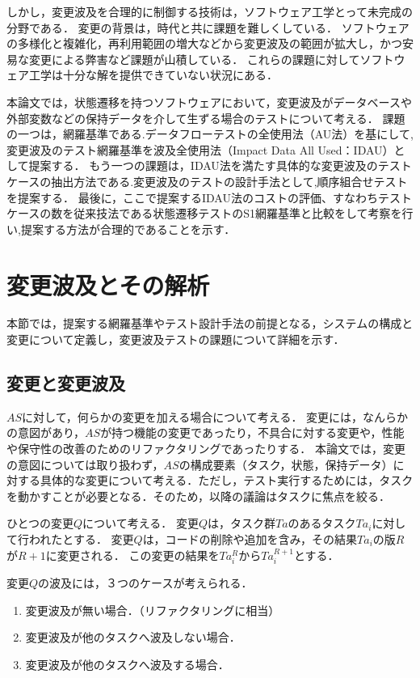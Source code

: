 \documentclass[a4paper,12pt]{jreport}
\begin{document}
しかし，変更波及を合理的に制御する技術は，ソフトウェア工学とって未完成の分野である\cite{arnold1996software}．
変更の背景は，時代と共に課題を難しくしている．
ソフトウェアの多様化と複雑化，再利用範囲の増大などから変更波及の範囲が拡大し，かつ安易な変更による弊害など課題が山積している．
これらの課題に対してソフトウェア工学は十分な解を提供できていない状況にある\cite{li2013survey}．


本論文では，状態遷移を持つソフトウェアにおいて，変更波及がデータベースや外部変数などの保持データを介して生ずる場合のテストについて考える．
課題の一つは，網羅基準である.データフローテストの全使用法（AU法）\cite{beiz90}を基にして,変更波及のテスト網羅基準を波及全使用法（Impact Data All Used：IDAU）として提案する．
もう一つの課題は，IDAU法を満たす具体的な変更波及のテストケースの抽出方法である.変更波及のテストの設計手法として,順序組合せテストを提案する．
最後に，ここで提案するIDAU法のコストの評価、すなわちテストケースの数を従来技法である状態遷移テストのS1網羅基準と比較をして考察を行い,提案する方法が合理的であることを示す．




\section{変更波及とその解析}
本節では，提案する網羅基準やテスト設計手法の前提となる，システムの構成と変更について定義し，変更波及テストの課題について詳細を示す．




\subsection{変更と変更波及}
$AS$に対して，何らかの変更を加える場合について考える．
変更には，なんらかの意図があり，$AS$が持つ機能の変更であったり，不具合に対する変更や，性能や保守性の改善のためのリファクタリングであったりする．
本論文では，変更の意図については取り扱わず，$AS$の構成要素（タスク，状態，保持データ）に対する具体的な変更について考える．ただし，テスト実行するためには，タスクを動かすことが必要となる．そのため，以降の議論はタスクに焦点を絞る．%

ひとつの変更$Q$について考える．
変更$Q$は，タスク群$Ta$のあるタスク$Ta_i$に対して行われたとする．
変更$Q$は，コードの削除や追加を含み，その結果$Ta_i$の版$R$が$R+1$に変更される．
この変更の結果を$Ta^{R}_i$から$Ta^{R+1}_i$とする．

変更$Q$の波及には，３つのケースが考えられる．
\begin{enumerate}
  \item 変更波及が無い場合．（リファクタリングに相当）
  \item 変更波及が他のタスクへ波及しない場合．%
  \item 変更波及が他のタスクへ波及する場合．
\end{enumerate}
\end{document}
